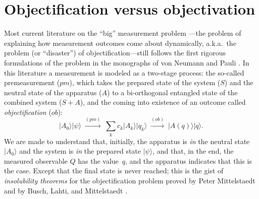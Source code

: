 \documentclass[12pt]{article}
\newcommand{\ket}[1]{|#1\rangle}
\newcommand{\be}{\begin{equation}}
\newcommand{\ee}{\end{equation}}
\begin{document}
\section{Objectification versus objectivation}\label{sec.ovo}
Most current literature on the ``big'' measurement problem \cite{Pitowsky2006}---the problem of explaining how measurement outcomes come about dynamically, a.k.a.\ the problem (or ``disaster''\cite{vF1990}) of objectification---still follows the first rigorous formulations of the problem in the monographs of von Neumann \cite{vN} and Pauli \cite{PauliGP}. In this literature a measurement is modeled as a two-stage process: the so-called {premeasurement} ($pm$), which takes the prepared state of the system ($S$) and the neutral state of the apparatus ($A$) to a bi-orthogonal entangled state of the combined system ($S{+}A$), and the coming into existence of an outcome called \emph{objectification} ($ob$):
\be
\ket{A_0}\ket\psi
                 \;\stackrel{(pm)}{\longrightarrow}\;
\sum_{k}c_k\ket{A_k}\ket{q_k}
                  \;\stackrel{(ob)}{\longrightarrow}\;
\ket{A(q)}\ket{q}.
\label{eq_pmob}
\ee
We are made to understand that, initially, the apparatus is \emph{in} the neutral state $\ket{A_0}$ and the system is \emph{in} the prepared state $\ket\psi$, and that, in the end, the measured observable $Q$ has the value~$q$, and the apparatus indicates that this is the case. Except that the final state is never reached; this is the gist of \emph{insolubility theorems} for the objectification problem proved by Peter Mittelstaedt \cite{Mittelstaedt98} and by Busch, Lahti, and Mittelstaedt \cite{BLM96}.
\end{document}
